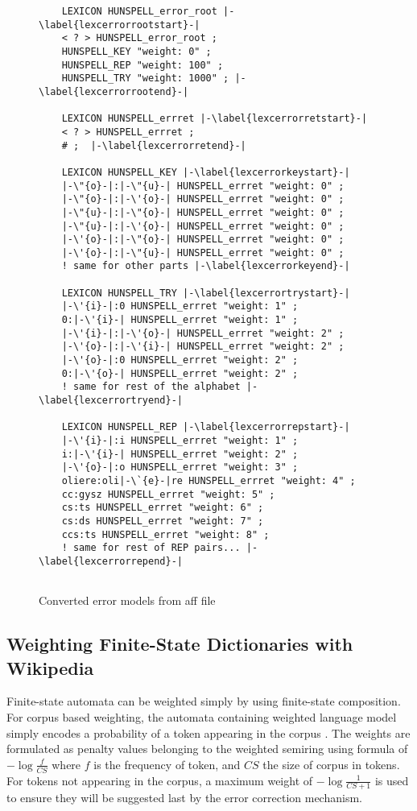 \documentclass[a4paper,runningheads]{llncs}
\begin{document}
\begin{figure}[tbp]
  \centering
  \begin{lstlisting}
    LEXICON HUNSPELL_error_root |-\label{lexcerrorrootstart}-|
    < ? > HUNSPELL_error_root ; 
    HUNSPELL_KEY "weight: 0" ;
    HUNSPELL_REP "weight: 100" ;
    HUNSPELL_TRY "weight: 1000" ; |-\label{lexcerrorrootend}-|
    
    LEXICON HUNSPELL_errret |-\label{lexcerrorretstart}-|
    < ? > HUNSPELL_errret ; 
    # ;  |-\label{lexcerrorretend}-|
    
    LEXICON HUNSPELL_KEY |-\label{lexcerrorkeystart}-|
    |-\"{o}-|:|-\"{u}-| HUNSPELL_errret "weight: 0" ; 
    |-\"{o}-|:|-\'{o}-| HUNSPELL_errret "weight: 0" ;
    |-\"{u}-|:|-\"{o}-| HUNSPELL_errret "weight: 0" ;
    |-\"{u}-|:|-\'{o}-| HUNSPELL_errret "weight: 0" ;
    |-\'{o}-|:|-\"{o}-| HUNSPELL_errret "weight: 0" ;
    |-\'{o}-|:|-\"{u}-| HUNSPELL_errret "weight: 0" ; 
    ! same for other parts |-\label{lexcerrorkeyend}-|
    
    LEXICON HUNSPELL_TRY |-\label{lexcerrortrystart}-|
    |-\'{i}-|:0 HUNSPELL_errret "weight: 1" ;
    0:|-\'{i}-| HUNSPELL_errret "weight: 1" ;
    |-\'{i}-|:|-\'{o}-| HUNSPELL_errret "weight: 2" ;
    |-\'{o}-|:|-\'{i}-| HUNSPELL_errret "weight: 2" ;
    |-\'{o}-|:0 HUNSPELL_errret "weight: 2" ;
    0:|-\'{o}-| HUNSPELL_errret "weight: 2" ;
    ! same for rest of the alphabet |-\label{lexcerrortryend}-|
    
    LEXICON HUNSPELL_REP |-\label{lexcerrorrepstart}-|
    |-\'{i}-|:i HUNSPELL_errret "weight: 1" ;
    i:|-\'{i}-| HUNSPELL_errret "weight: 2" ;
    |-\'{o}-|:o HUNSPELL_errret "weight: 3" ;       
    oliere:oli|-\`{e}-|re HUNSPELL_errret "weight: 4" ; 
    cc:gysz HUNSPELL_errret "weight: 5" ;       
    cs:ts HUNSPELL_errret "weight: 6" ;       
    cs:ds HUNSPELL_errret "weight: 7" ;       
    ccs:ts HUNSPELL_errret "weight: 8" ;  
    ! same for rest of REP pairs... |-\label{lexcerrorrepend}-|
    
  \end{lstlisting}
  \caption{Converted error models from aff file}
  \label{fig:lexc-error-models}
\end{figure}

\subsection{Weighting Finite-State Dictionaries with Wikipedia}

Finite-state automata can be weighted simply by using finite-state composition.
For corpus based weighting, the automata containing weighted language model
simply encodes a probability of a token appearing in the corpus \cite{conf/lrec/Pirinen2010}.
The weights are formulated as penalty values belonging to the weighted semiring
using formula of $-\log\frac{f}{CS}$ where $f$ is the frequency of token, and
$CS$ the size of corpus in tokens. For tokens not appearing in the corpus, a
maximum weight of $-\log\frac{1}{CS+1}$ is used to ensure they will be suggested
last by the error correction mechanism.
\end{document}
